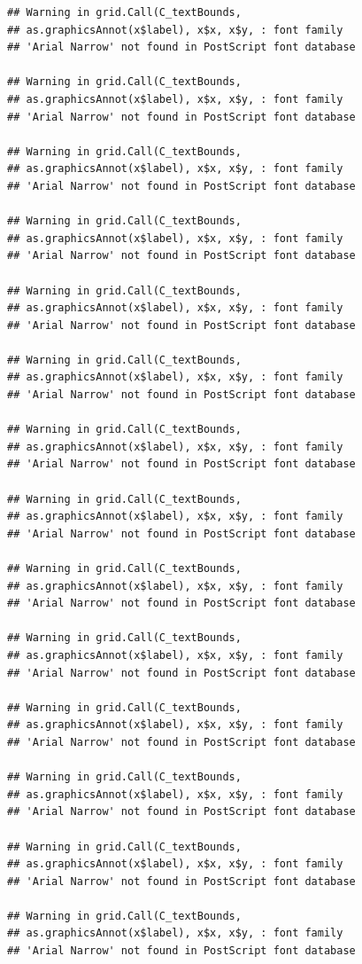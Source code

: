 \documentclass[]{krantz}
\begin{document}
\begin{verbatim}
## Warning in grid.Call(C_textBounds,
## as.graphicsAnnot(x$label), x$x, x$y, : font family
## 'Arial Narrow' not found in PostScript font database

## Warning in grid.Call(C_textBounds,
## as.graphicsAnnot(x$label), x$x, x$y, : font family
## 'Arial Narrow' not found in PostScript font database

## Warning in grid.Call(C_textBounds,
## as.graphicsAnnot(x$label), x$x, x$y, : font family
## 'Arial Narrow' not found in PostScript font database

## Warning in grid.Call(C_textBounds,
## as.graphicsAnnot(x$label), x$x, x$y, : font family
## 'Arial Narrow' not found in PostScript font database

## Warning in grid.Call(C_textBounds,
## as.graphicsAnnot(x$label), x$x, x$y, : font family
## 'Arial Narrow' not found in PostScript font database

## Warning in grid.Call(C_textBounds,
## as.graphicsAnnot(x$label), x$x, x$y, : font family
## 'Arial Narrow' not found in PostScript font database

## Warning in grid.Call(C_textBounds,
## as.graphicsAnnot(x$label), x$x, x$y, : font family
## 'Arial Narrow' not found in PostScript font database

## Warning in grid.Call(C_textBounds,
## as.graphicsAnnot(x$label), x$x, x$y, : font family
## 'Arial Narrow' not found in PostScript font database

## Warning in grid.Call(C_textBounds,
## as.graphicsAnnot(x$label), x$x, x$y, : font family
## 'Arial Narrow' not found in PostScript font database

## Warning in grid.Call(C_textBounds,
## as.graphicsAnnot(x$label), x$x, x$y, : font family
## 'Arial Narrow' not found in PostScript font database

## Warning in grid.Call(C_textBounds,
## as.graphicsAnnot(x$label), x$x, x$y, : font family
## 'Arial Narrow' not found in PostScript font database

## Warning in grid.Call(C_textBounds,
## as.graphicsAnnot(x$label), x$x, x$y, : font family
## 'Arial Narrow' not found in PostScript font database

## Warning in grid.Call(C_textBounds,
## as.graphicsAnnot(x$label), x$x, x$y, : font family
## 'Arial Narrow' not found in PostScript font database

## Warning in grid.Call(C_textBounds,
## as.graphicsAnnot(x$label), x$x, x$y, : font family
## 'Arial Narrow' not found in PostScript font database


\end{verbatim}
\end{document}
